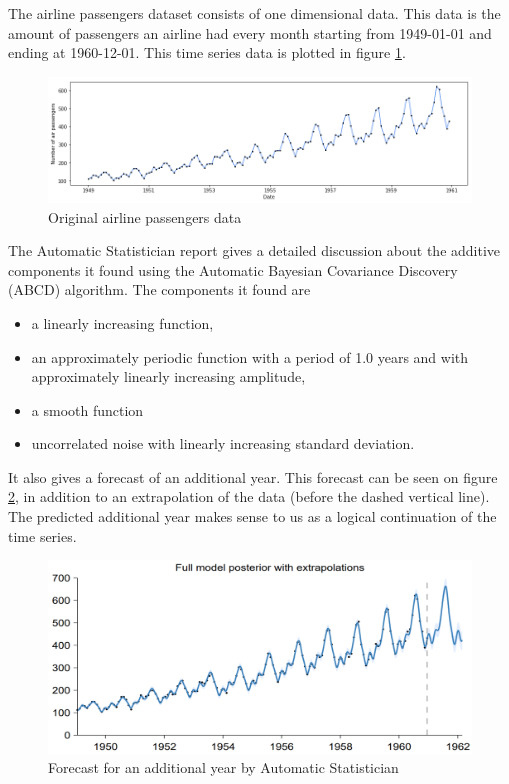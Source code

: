 \documentclass[a4paper, 10pt, conference]{ieeeconf}
\begin{document}
The airline passengers dataset consists of one dimensional data. This data is the amount of passengers an airline had every month starting from 1949-01-01 and ending at 1960-12-01. This time series data is plotted in figure \ref{fig:airpax_og}.\\

\begin{figure}[!ht]
    \centering
    \includegraphics[width=\linewidth]{report/images/airpax_og.png}
    \caption{Original airline passengers data}
    \label{fig:airpax_og}
\end{figure}

The Automatic Statistician report gives a detailed discussion about the additive components it found using the Automatic Bayesian Covariance Discovery (ABCD) algorithm. The components it found are 

\begin{itemize}
    \item a linearly increasing function,
    \item an approximately periodic function with a period of 1.0 years and with approximately linearly increasing amplitude,
    \item a smooth function
    \item uncorrelated noise with linearly increasing standard deviation.
\end{itemize}

It also gives a forecast of an additional year. This forecast can be seen on figure \ref{fig:airpax_as_forecast}, in addition to an extrapolation of the data (before the dashed vertical line). The predicted additional year makes sense to us as a logical continuation of the time series.

\begin{figure}[!ht]
    \centering
    \includegraphics[width=\linewidth]{report/images/airpax_as_forecast.png}
    \caption{Forecast for an additional year by Automatic Statistician}
    \label{fig:airpax_as_forecast}
\end{figure}
\end{document}
